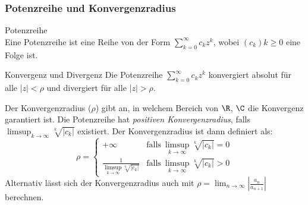 
\subsubsection{Potenzreihe und Konvergenzradius}
\begin{definition}{Potenzreihe}\\
    Eine Potenzreihe ist eine Reihe von der Form $\sum_{k=0}^\infty c_k z^k$, wobei $(c_k)k\geq0$ eine Folge ist.
\end{definition}
\begin{corollary}{Konvergenz und Divergenz}
    Die Potenzreihe $\sum_{k=0}^\infty c_k z^k$ konvergiert absolut für alle $|z| < \rho$ und divergiert für alle $|z| > \rho$.
\end{corollary}
Der Konvergenzradius ($\rho$) gibt an, in welchem Bereich von $\R$, $\C$ die Konvergenz garantiert ist. Die Potenzreihe hat \emph{positiven Konvergenzradius}, falls $\limsup_{k \to \infty} \sqrt[k]{|c_k|}$ existiert. Der Konvergenzradius ist dann definiert als:
\begin{equation*}
    \rho = \begin{cases}
        + \infty & \text{falls}~\limsup_{k \to \infty} \sqrt[k]{|c_k|} = 0\\
        \frac{1}{\limsup_{k \to \infty} \sqrt[k]{|c_k|}} & \text{falls}~\limsup_{k \to \infty} \sqrt[k]{|c_k|} > 0
    \end{cases}
\end{equation*}
Alternativ lässt sich der Konvergenzradius auch mit $\rho = \lim_{n \to \infty} \left| \frac{a_n}{a_{n+1}} \right|$ berechnen.


